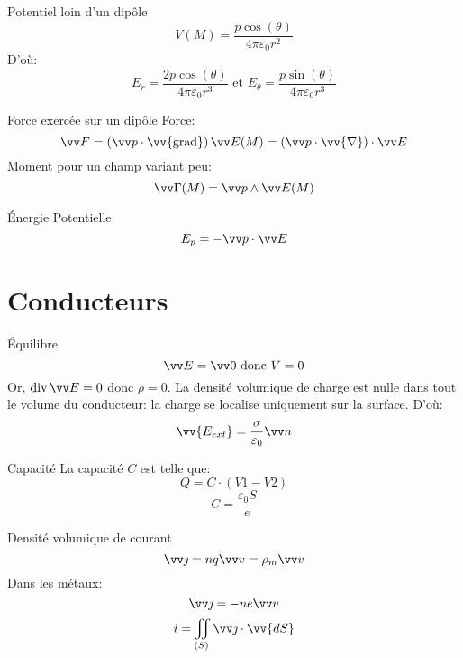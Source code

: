 \documentclass[french, a4paper, 11pt, twocolumn]{article}
\newcommand{\po}{\left(}         %
\newcommand{\pf}{\right)}        %
\newcommand{\pof}[1]{\po #1 \pf} %
\newcommand{\vect}[1]{\vv{#1}}
\newcommand{\vabla}{\vect{\nabla}}    %
\newcommand{\grad}{\vect{\mathrm{grad}}}  %
\DeclareMathOperator{\diverg}{div}        %
\begin{document}
\begin{cadre}{Potentiel loin d'un dipôle}
  \[V(M) = \dfrac{p\cos(\theta)}{4\pi\varepsilon_{0}r^{2}}\]
  D'où:
  \[E_{r} = \dfrac{2p\cos(\theta)}{4\pi\varepsilon_{0}r^{3}}\text{ et } E_{\theta} = \dfrac{p\sin(\theta)}{4\pi\varepsilon_{0}r^{3}}\]
\end{cadre}

\begin{cadre}{Force exercée sur un dipôle}
  Force:
  \[\vv F = \pof{\vv p \cdot \grad}\vv E(M) = \po\vv p\cdot\vabla\pf\cdot\vv E\]
  Moment pour un champ variant peu:
  \[\vv\Gamma(M) = \vv p \wedge \vv E(M)\]
\end{cadre}

\begin{cadre}{Énergie Potentielle}
  \[E_{p} = -\vv p\cdot \vv E\]
\end{cadre}

\section{Conducteurs}
\begin{cadre}{Équilibre}
  \[\vv E = \vv 0 \text{ donc } V = 0\]
  Or, \(\diverg \vv E = 0\) donc \(\rho = 0\). La densité volumique de charge est nulle dans tout le volume du conducteur: la charge se localise uniquement sur la surface.
  D'où:
  \[\vv {E_{ext}} = \dfrac{\sigma}{\varepsilon_{0}}\vv n\]
\end{cadre}

\begin{figure}[h]
  \centering
\end{figure}
\begin{cadre}{Capacité}
  La capacité \(C\) est telle que:
  \[Q = C\cdot\pof{V1 - V2}\]
  \[C = \dfrac{\varepsilon_{0}S}{e}\]
\end{cadre}

\begin{cadre}{Densité volumique de courant}
  \[\vv \jmath = nq\vv v = \rho_{m}\vv v\]
  Dans les métaux:
  \[\vv \jmath = -ne\vv v\]
  \[i = \iint_{(S)}\vv\jmath\cdot\vv{dS}\]
\end{cadre}
\end{document}
